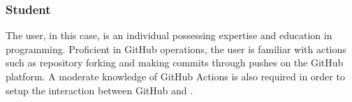 \subsubsection{Student}
The user, in this case, is an individual possessing expertise and education in programming. Proficient in GitHub operations, the user is familiar with actions such as repository forking and making commits through pushes on the GitHub platform. A moderate knowledge of GitHub Actions is also required in order to setup the interaction between GitHub and \app.






